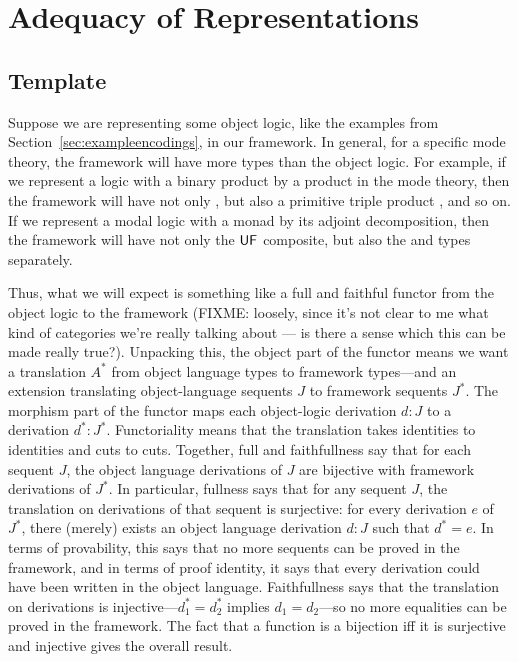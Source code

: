 
\section{Adequacy of Representations}
\label{sec:adequacy-long}

\subsection{Template}

Suppose we are representing some object logic, like the examples from
Section~\ref{sec:exampleencodings}, in our framework.  In general, for a
specific mode theory, the framework will have more types than the object
logic.  For example, if we represent a logic with a binary product by a
product in the mode theory, then the framework will have not only , but also a primitive triple product , and so on.  If we represent a modal logic
with a monad by its adjoint decomposition, then the framework will have
not only the $\mathsf{U} \mathsf{F}$ composite, but also the \Usymb\/ and
\Fsymb\/ types separately.

Thus, what we will expect is something like a full and faithful functor
from the object logic to the framework (FIXME: loosely, since it's not
clear to me what kind of categories we're really talking about --- is
there a sense which this can be made really true?).  Unpacking this, the
object part of the functor means we want a translation $A^*$ from object
language types to framework types---and an extension translating
object-language sequents $J$ to framework sequents $J^*$.  The morphism
part of the functor maps each object-logic derivation $d : J$ to a
derivation $d^* : J^*$.  Functoriality means that the translation takes
identities to identities and cuts to cuts.  Together, full and
faithfullness say that for each sequent $J$, the object language
derivations of $J$ are bijective with framework derivations of $J^*$.
In particular, fullness says that for any sequent $J$, the translation
on derivations of that sequent is surjective: for every derivation $e$
of $J^*$, there (merely) exists an object language derivation $d : J$
such that $d^* = e$.  In terms of provability, this says that no more
sequents can be proved in the framework, and in terms of proof identity,
it says that every derivation could have been written in the object
language. Faithfullness says that the translation on derivations is
injective---$d_1^* = d_2^*$ implies $d_1 = d_2$---so no more equalities
can be proved in the framework.  The fact that a function is a bijection
iff it is surjective and injective gives the overall result.

